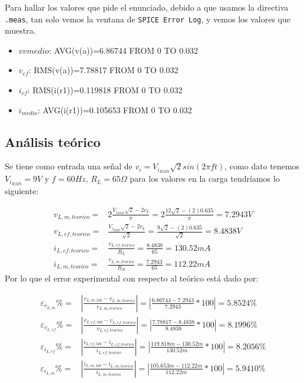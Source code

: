 \documentclass[a4paper]{article} %
\begin{document}
Para hallar los valores que pide el enunciado, debido a que usamos la directiva \texttt{.meas}, tan solo vemos la ventana de \texttt{SPICE Error Log}, y vemos los valores que muestra.

\begin{itemize}
	\item $v{vmedio}$: AVG(v(a))=6.86744 FROM 0 TO 0.032
	\item $v_{ef}$: RMS(v(a))=7.78817 FROM 0 TO 0.032
	\item $i_{ef}$: RMS(i(r1))=0.119818 FROM 0 TO 0.032
	\item $i_{medio}$: AVG(i(r1))=0.105653 FROM 0 TO 0.032
\end{itemize}

\subsection{Análisis teórico}
Se tiene como entrada una señal de $v_i = V_{i_{RMS}}\sqrt{2}sin(2 \pi f t)$, como dato tenemos $V_{i_{RMS}} = 9V$ y $f=60Hz$, $R_L = 65 \Omega$ para los valores en la carga tendríamos lo siguiente:

\begin{align}
	v_{L,m, teorico} = & 2\frac{  V_{i_{RMS}}\sqrt{2} - 2v_k}{\pi} = 2 \frac{12\sqrt{2} - (2)0.635}{\pi} = 7.2943 V \\
	v_{L,ef, teorico} = & \frac{ V_{i_{RMS}}\sqrt{2} - 2v_k}{\sqrt{2}} = \frac{9\sqrt{2} - (2)0.635}{\sqrt{2}} = 8.4838V \\
	i_{L,ef, teorico} = & \frac{v_ {L,ef, teorico}}{R_L} = \frac{8.4838}{65} = 130.52 mA \\
	i_{L,m,teorico} = & \frac{v_{L,m, teorico}}{R_R} = \frac{7.2943}{65} = 112.22mA
\end{align}
Por lo que el error experimental con respecto al teórico está dado por:

\begin{align}
	\varepsilon_{v_{L,m}} \% = & \left|\frac{v_{L,m,lab} - v_{L,m,teorico}}{v_{L,m,teorico}} \right| = \left| \frac{6.86744 - 7.2943}{7.2943} *100 \right|= 5.8524 \% \\
	\varepsilon_{v_{L,ef}} \% = & \left|\frac{v_{L,ef,lab} - v_{L,ef,teorico}}{v_{L,ef,teorico}} \right| = \left| \frac{7.78817 - 8.4838}{8.4838} *100 \right|= 8.1996 \% \\
	\varepsilon_{i_{L,ef}} \% = & \left|\frac{i_{L,ef,lab} - i_{L,ef,teorico}}{i_{L,ef,teorico}} \right| = \left| \frac{119.818m - 130.52m}{130.52m} *100 \right|= 8.2056 \% \\
	\varepsilon_{i_{L,m}} \% = & \left|\frac{i_{L,m,lab} - i_{L,m,teorico}}{i_{L,m,teorico}} \right| = \left| \frac{105.653m - 112.22m}{112.22m} *100 \right|= 5.9410 \%
\end{align}
\end{document}
